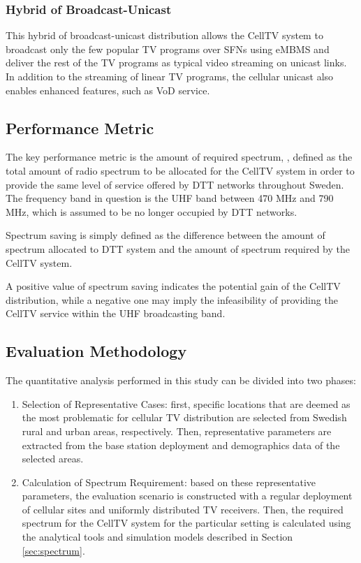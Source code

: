 \documentclass[journal]{IEEEtran}
\begin{document}
\subsubsection{\textbf{Hybrid of Broadcast-Unicast}}
This hybrid of broadcast-unicast distribution allows the CellTV system to broadcast only the few popular TV programs over SFNs using eMBMS and deliver the rest of the TV programs as typical video streaming on unicast links. In addition to the streaming of linear TV programs, the cellular unicast also enables enhanced features, such as VoD service.

\subsection{Performance Metric}
The key performance metric is the amount of required spectrum, , defined as the total amount of radio spectrum to be allocated for the CellTV system in order to provide the same level of service offered by DTT networks throughout Sweden. The frequency band in question is the UHF band between 470 MHz and 790 MHz, which is assumed to be no longer occupied by DTT networks.

Spectrum saving is simply defined as the difference between the amount of spectrum allocated to DTT system and the amount of spectrum required by the CellTV system.
	
A positive value of spectrum saving indicates the potential gain of the CellTV distribution, while a negative one may imply the infeasibility of providing the CellTV service within the UHF broadcasting band.



\subsection{Evaluation Methodology}
\label{sec:Methodology}

The quantitative analysis performed in this study can be divided into two phases:
\begin{enumerate}
  \item 	{Selection of Representative Cases}: first, specific locations that are deemed as the most problematic for cellular TV distribution are selected from Swedish rural and urban areas, respectively. Then, representative parameters are extracted from the base station deployment and demographics data of the selected areas.

  \item {Calculation of Spectrum Requirement}: based on these representative parameters, the evaluation scenario is constructed with a regular deployment of cellular sites and uniformly distributed TV receivers. Then, the required spectrum for the CellTV system for the particular setting is calculated using the analytical tools and simulation models described in Section \ref{sec:spectrum}.
\end{enumerate}
\end{document}

